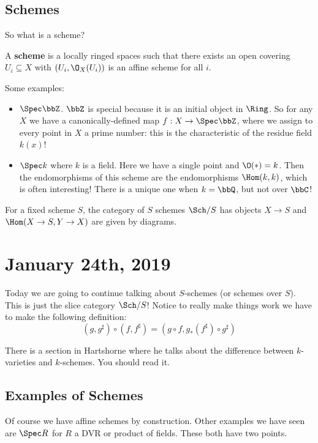 \documentclass[12pt]{article}
\begin{document}
\subsection{Schemes}
So what is a scheme?
\begin{defn}
	A \textbf{scheme} is a locally ringed spaces such that there exists an open covering $U_i\subseteq X$ with $(U_i, \O_X(U_i))$ is an affine scheme for all $i$.
\end{defn}
Some examples:
\begin{itemize}
	\item $\Spec \bbZ$. $\bbZ$ is special because it is an initial object in $\Ring$. So for any $X$ we have a 
	canonically-defined map $f:X\to \Spec \bbZ$, where we assign to every point in $X$ a prime number: this is the characteristic of the residue field $k(x)$!
	\item $\Spec k$ where $k$ is a field. Here we have a single point and $\O(\ast)=k$. Then the endomorphisms of this scheme are 
	the endomorphisms $\Hom(k,k)$, which is often interesting! There is a unique one when $k=\bbQ$, but not over $\bbC$!
\end{itemize}

\begin{defn}
	For a fixed scheme $S$, the category of $S$ schemes $\Sch/S$ has objects $X\to S$ and 
	$\Hom(X\to S,Y\to X)$ are given by diagrams.
\end{defn}

\section{January 24th, 2019}
Today we are going to continue talking about $S$-schemes (or schemes over $S$). This is just the slice category $\Sch/S$!
Notice to really make things work we have to make the following definition:
\[(g,g^\sharp)\circ(f,f^\sharp)=(g\circ f,g_\ast(f^\sharp)\circ g^\sharp)\]
\begin{rmk}
	There is a section in Hartshorne where he talks about the difference between $k$-varieties and $k$-schemes. You should read it.
\end{rmk}

\subsection{Examples of Schemes}
Of course we have affine schemes by construction. Other examples we have seen are $\Spec R$ for $R$ a DVR or product of fields. These both 
have two points. 
\end{document}
